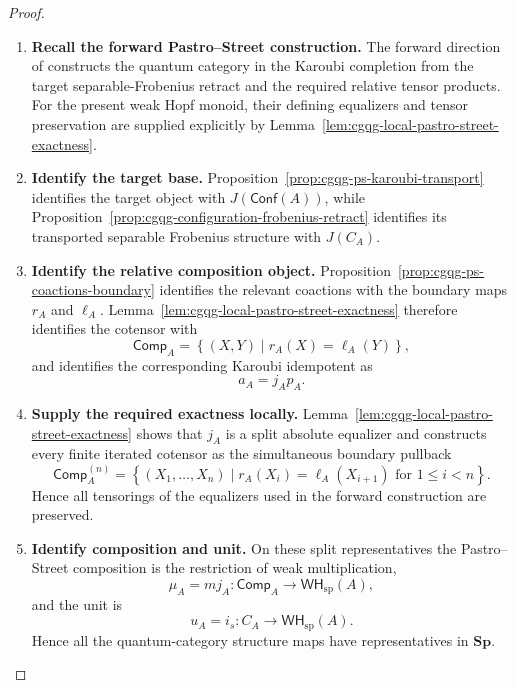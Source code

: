 \documentclass[oneside]{article}
\newcommand{\Conf}{\mathsf{Conf}}
\newcommand{\WH}{\mathsf{WH}}
\newcommand{\Sp}{\mathbf{Sp}}
\theoremstyle{plain}
\theoremstyle{definition}
\theoremstyle{remark}
\begin{document}
\begin{proof}
    \leavevmode
    \begin{enumerate}[beginpenalty=10000]
        \item \textbf{Recall the forward Pastro--Street construction.} The forward direction of \cite[Thm.~6.1 and \S6.1]{PastroStreet2009} constructs the quantum category in the Karoubi completion from the target separable-Frobenius retract and the required relative tensor products. For the present weak Hopf monoid, their defining equalizers and tensor preservation are supplied explicitly by Lemma~\ref{lem:cgqg-local-pastro-street-exactness}.

        \item \textbf{Identify the target base.} Proposition~\ref{prop:cgqg-ps-karoubi-transport} identifies the target object with \(J(\Conf(A))\), while Proposition~\ref{prop:cgqg-configuration-frobenius-retract} identifies its transported separable Frobenius structure with \(J(C_A)\).

        \item \textbf{Identify the relative composition object.} Proposition~\ref{prop:cgqg-ps-coactions-boundary} identifies the relevant coactions with the boundary maps \(r_A\) and \(\ell_A\). Lemma~\ref{lem:cgqg-local-pastro-street-exactness} therefore identifies the cotensor with
        \[
            \mathsf{Comp}_A
            =
            \left\{
                (X,Y)
                \mid
                r_A(X)=\ell_A(Y)
            \right\},
        \]
        and identifies the corresponding Karoubi idempotent as
        \[
            a_A=j_Ap_A.
        \]

        \item \textbf{Supply the required exactness locally.} Lemma~\ref{lem:cgqg-local-pastro-street-exactness} shows that \(j_A\) is a split absolute equalizer and constructs every finite iterated cotensor as the simultaneous boundary pullback
        \[
            \mathsf{Comp}_A^{(n)}
            =
            \left\{
                (X_1,\ldots,X_n)
                \mid
                r_A(X_i)=\ell_A(X_{i+1})
                \text{ for }1\leq i<n
            \right\}.
        \]
        Hence all tensorings of the equalizers used in the forward construction are preserved.

        \item \textbf{Identify composition and unit.} On these split representatives the Pastro--Street composition is the restriction of weak multiplication,
        \[
            \mu_A
            =
            mj_A:
            \mathsf{Comp}_A
            \longrightarrow
            \WH_{\mathrm{sp}}(A),
        \]
        and the unit is
        \[
            u_A
            =
            i_s:
            C_A
            \longrightarrow
            \WH_{\mathrm{sp}}(A).
        \]
        Hence all the quantum-category structure maps have representatives in \(\Sp\).


\end{enumerate}
\end{proof}
\end{document}
